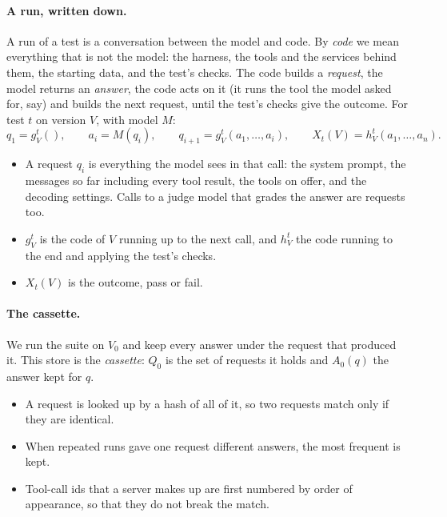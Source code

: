 \documentclass[11pt,a4paper]{article}
\begin{document}
\paragraph{A run, written down.} A run of a test is a conversation between the model and code. By \emph{code} we
mean everything that is not the model: the harness, the tools and the services behind them, the starting data, and
the test's checks. The code builds a \emph{request}, the model returns an \emph{answer}, the code acts on it (it
runs the tool the model asked for, say) and builds the next request, until the test's checks give the outcome.
For test $t$ on version $V$, with model $M$:
\[
  q_1 = g^t_V(), \qquad a_i = M(q_i), \qquad q_{i+1} = g^t_V(a_1, \dots, a_i), \qquad
  X_t(V) = h^t_V(a_1, \dots, a_n).
\]
\begin{itemize}
  \item A request $q_i$ is everything the model sees in that call: the system prompt, the messages so far
        including every tool result, the tools on offer, and the decoding settings. Calls to a judge model that
        grades the answer are requests too.
  \item $g^t_V$ is the code of $V$ running up to the next call, and $h^t_V$ the code running to the end and
        applying the test's checks.
  \item $X_t(V)$ is the outcome, pass or fail.
\end{itemize}

\paragraph{The cassette.} We run the suite on $V_0$ and keep every answer under the request that produced it. This
store is the \emph{cassette}: $Q_0$ is the set of requests it holds and $A_0(q)$ the answer kept for $q$.
\begin{itemize}
  \item A request is looked up by a hash of all of it, so two requests match only if they are identical.
  \item When repeated runs gave one request different answers, the most frequent is kept.
  \item Tool-call ids that a server makes up are first numbered by order of appearance, so that they do not break
        the match.
\end{itemize}
\end{document}

